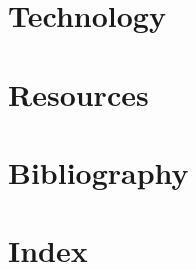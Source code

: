 \documentclass[oneside,11pt]{memoir} %
\begin{document}
\chapter{Technology}

\chapter{Resources}

\chapter{Bibliography}
\chapter{Index}
\end{document}
